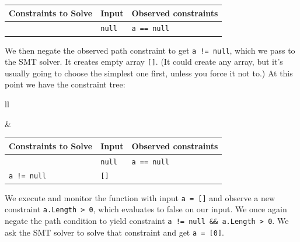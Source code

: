 \documentclass[11pt]{article}
\begin{document}
\begin{center}
\begin{tabular}{l|l|l}
  Constraints to Solve & Input & Observed constraints\\ \hline
   & \texttt{null} & \texttt{a == null}
\end{tabular}
\end{center}

We then negate the observed path constraint to get \texttt{a != null}, which we pass to the SMT solver. It creates
empty array \texttt{[]}. (It could create any array, but it's usually going to choose the simplest one first, unless you
force it not to.) At this point we have the constraint tree:

\begin{center}
  \begin{tabular}{ll}
    \begin{minipage}{.3\textwidth}
      \begin{center}
\begin{tikzpicture}[
        node distance=1.5cm and 1cm,
        every node/.style={draw, rounded corners, fill=gray!10, align=center},
        every path/.style={thick},
        decision/.style={draw, rounded corners, fill=gray!20, align=center, minimum width=3.5cm, yshift=2em}
    ]


  \node (start) {\texttt{a == null}};
  \node (left) [below left=of start, text width=0.1em,yshift=2em] {};
  \node (right) [below right=of start, text width=0.1em,yshift=2em] {};

  \draw[->] (start) -- (right);
  \draw[->,dotted] (start) -- (left);
\end{tikzpicture}
      \end{center}
    \end{minipage}
&
    \begin{minipage}{.45\textwidth}
\begin{tabular}{l|l|l}
  Constraints to Solve & Input & Observed constraints\\ \hline
   & \texttt{null} & \texttt{a == null}\\ \hline
\texttt{a != null} & \texttt{[]}
\end{tabular}
    \end{minipage}
  \end{tabular}
\end{center}
We execute and monitor the function with input \texttt{a = []} and observe a new constraint
\texttt{a.Length > 0}, which evaluates to false on our input.
We once again negate the path condition to yield constraint \texttt{a != null \&\& a.Length > 0}.
We ask the SMT solver to solve that constraint and get \texttt{a = [0]}.
\end{document}

